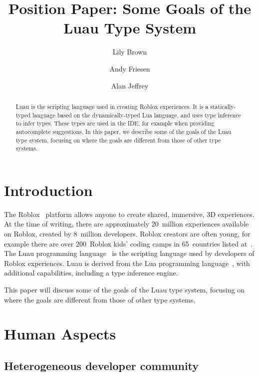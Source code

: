 \documentclass[acmsmall]{acmart}
\begin{document}
\title{Position Paper: Some Goals of the Luau Type System}

\author{Lily Brown}
\author{Andy Friesen}
\author{Alan Jeffrey}

\begin{abstract}
  Luau is the scripting language used in creating Roblox experiences.
  It is a statically-typed language based on the dynamically-typed Lua language,
  and uses type inference to infer types. These types are used in the
  IDE, for example when providing autocomplete suggestions. In this
  paper, we describe some of the goals of the Luau type system,
  focusing on where the goals are different from those of other type systems.
\end{abstract}

\maketitle

\section{Introduction}

The Roblox~\cite{Roblox} platform allows anyone to create shared,
immersive, 3D experiences.  At the time of writing, there are
approximately 20~million experiences available on Roblox, created
by 8~million developers.  Roblox creators are often young, for
example there are over 200~Roblox kids' coding camps in 65~countries
listed at~\cite{AllEducators}.
The Luau programming language~\cite{Luau} is the scripting language
used by developers of Roblox experiences. Luau is derived from the Lua
programming language~\cite{Lua}, with additional capabilities,
including a type inference engine.

This paper will discuss some of the goals of the Luau type system,
focusing on where the goals are different from those of other type systems.

\section{Human Aspects}
\subsection{Heterogeneous developer community}
\end{document}
